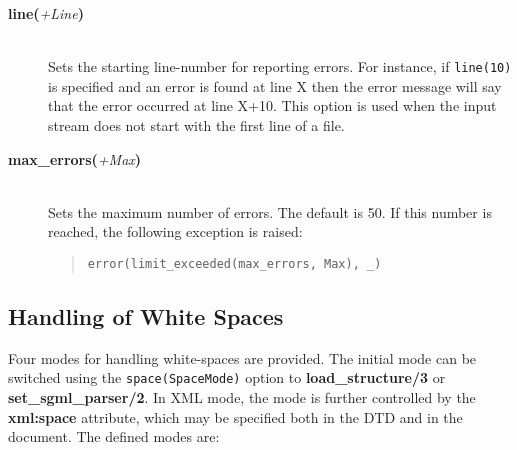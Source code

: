 \begin{description}
\begin{description}
  \item[{\bf line}{\bf (}{\it +Line}{\bf )}]\mbox{}\\
    Sets the starting line-number for reporting errors. For instance, if
    {\tt line(10)} is specified and an error is found at line X then the
    error message will say that the error occurred at line X+10.
    This option is used when the input stream does not start with the first
    line of a file.
    
  \item[{\bf max\_errors}{\bf (}{\it +Max}{\bf )}]\mbox{}\\
Sets the maximum number of errors.  The default is 50. If this number
    is reached, the following exception is raised:
    \begin{quote}
      {\tt error(limit\_exceeded(max\_errors, Max), \_)} 
    \end{quote}

  \end{description}

\end{description}

\subsection{Handling of  White Spaces}\label{sec:space}

Four modes for handling white-spaces are provided. The initial mode can be
switched using the {\tt space(SpaceMode)} option to
{\bf load\_structure/3} or {\bf set\_sgml\_parser/2}. In XML
mode, the mode is further controlled by the {\bf xml:space} attribute,
which may be specified both in the DTD and in the document. The defined
modes are:



